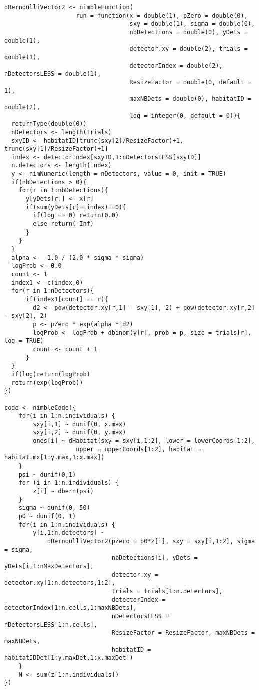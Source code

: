 \begin{singlespace}
\begin{small}
\begin{verbatim}
dBernoulliVector2 <- nimbleFunction(
                    run = function(x = double(1), pZero = double(0),
                                   sxy = double(1), sigma = double(0),
                                   nbDetections = double(0), yDets = double(1),
                                   detector.xy = double(2), trials = double(1),
                                   detectorIndex = double(2), nDetectorsLESS = double(1),
                                   ResizeFactor = double(0, default = 1),
                                   maxNBDets = double(0), habitatID = double(2),
                                   log = integer(0, default = 0)){
  returnType(double(0))
  nDetectors <- length(trials)
  sxyID <- habitatID[trunc(sxy[2]/ResizeFactor)+1, trunc(sxy[1]/ResizeFactor)+1]
  index <- detectorIndex[sxyID,1:nDetectorsLESS[sxyID]]
  n.detectors <- length(index)
  y <- nimNumeric(length = nDetectors, value = 0, init = TRUE)
  if(nbDetections > 0){
    for(r in 1:nbDetections){
      y[yDets[r]] <- x[r] 
      if(sum(yDets[r]==index)==0){
        if(log == 0) return(0.0)
        else return(-Inf)
      } 
    } 
  }
  alpha <- -1.0 / (2.0 * sigma * sigma)
  logProb <- 0.0 
  count <- 1 
  index1 <- c(index,0) 
  for(r in 1:nDetectors){
      if(index1[count] == r){  
        d2 <- pow(detector.xy[r,1] - sxy[1], 2) + pow(detector.xy[r,2] - sxy[2], 2)
        p <- pZero * exp(alpha * d2)
        logProb <- logProb + dbinom(y[r], prob = p, size = trials[r], log = TRUE)
        count <- count + 1
      }
  }
  if(log)return(logProb)
  return(exp(logProb))
})

code <- nimbleCode({
    for(i in 1:n.individuals) {
        sxy[i,1] ~ dunif(0, x.max)
        sxy[i,2] ~ dunif(0, y.max)
        ones[i] ~ dHabitat(sxy = sxy[i,1:2], lower = lowerCoords[1:2], 
                    upper = upperCoords[1:2], habitat = habitat.mx[1:y.max,1:x.max])
    }
    psi ~ dunif(0,1)
    for (i in 1:n.individuals) {
        z[i] ~ dbern(psi)
    }
    sigma ~ dunif(0, 50)
    p0 ~ dunif(0, 1)
    for(i in 1:n.individuals) {
        y[i,1:n.detectors] ~ 
            dBernoulliVector2(pZero = p0*z[i], sxy = sxy[i,1:2], sigma = sigma,
                              nbDetections[i], yDets = yDets[i,1:nMaxDetectors],
                              detector.xy =  detector.xy[1:n.detectors,1:2],
                              trials = trials[1:n.detectors],
                              detectorIndex = detectorIndex[1:n.cells,1:maxNBDets], 
                              nDetectorsLESS = nDetectorsLESS[1:n.cells],  
                              ResizeFactor = ResizeFactor, maxNBDets = maxNBDets,
                              habitatID = habitatIDDet[1:y.maxDet,1:x.maxDet])
    }
    N <- sum(z[1:n.individuals])
})
\end{verbatim}
\end{small}
\end{singlespace}





